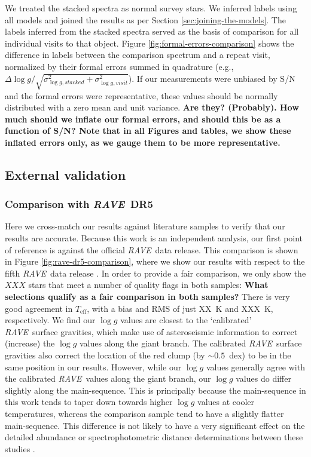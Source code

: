\documentclass[preprint,trackchanges]{aastex}
\newcommand{\acronym}[1]{{\small{#1}}}
\newcommand{\project}[1]{\textsl{#1}}
\newcommand{\rave}{\project{\acronym{RAVE}}}
\newcommand{\stub}[1]{{\color{blue} \textbf{#1}}}
\newcommand{\teff}{T_{\mathrm{eff}}}
\newcommand{\logg}{\log g}
\begin{document}
We treated the stacked spectra as normal survey stars.  We inferred labels
using all models and joined the results as per Section \ref{sec:joining-the-models}.  The labels inferred from the stacked spectra served as the basis
of comparison for all individual visits to that object.  Figure 
\ref{fig:formal-errors-comparison} shows the difference in labels 
between the comparison spectrum and a repeat visit, normalized by their 
formal errors summed in quadrature (e.g., 
$\Delta\logg/\sqrt{\sigma_{\logg,stacked}^2 + \sigma_{\logg,visit}^2}$).
If our measurements were unbiased by S/N and the formal errors were 
representative, these values should be normally distributed with a zero 
mean and unit variance.
\stub{Are they? (Probably). How much should we inflate our formal errors, and should this be as a function of S/N? Note that in all Figures and tables,
we show these inflated errors only, as we gauge them to be more representative.}


\subsection{External validation}
\label{sec:external-validation}

\subsubsection{Comparison with \rave\ DR5}

Here we cross-match our results against literature samples to verify that
our results are accurate.  Because this work is an independent analysis, our
first point of reference is against the official \rave\ data release.  This
comparison is shown in Figure \ref{fig:rave-dr5-comparison}, 
where we show our results with respect to the fifth \rave\ data release \citep{Kunder_2016}.  In order
to provide a fair comparison, we only show the $XXX$ stars that meet a number of quality
flags in both samples: 
\stub{What selections qualify as a fair comparison in both samples?}
There is very good agreement in $\teff$, with a bias
and RMS of just XX~K and XXX~K, respectively.  We find our $\logg$ values are
closest to the `calibrated' \rave\ surface gravities, which make use of 
asteroseismic information to correct (increase) the $\logg$ values along the
giant branch.  The calibrated \rave\ surface gravities also correct the 
location of the red clump (by $\sim0.5$~dex) to be in the same position in our
results.  However, while our $\logg$ values generally agree with the calibrated
\rave\ values along the giant branch, our $\logg$ values do differ slightly 
along the main-sequence.  This is principally because the main-sequence in 
this work tends to taper down towards higher $\logg$ values at cooler 
temperatures, whereas the comparison sample tend to have a slightly flatter
main-sequence.  This difference is not likely to have a very significant 
effect on the detailed abundance or spectrophotometric distance determinations
between these studies \citep{Binney_2014}.
\end{document}
